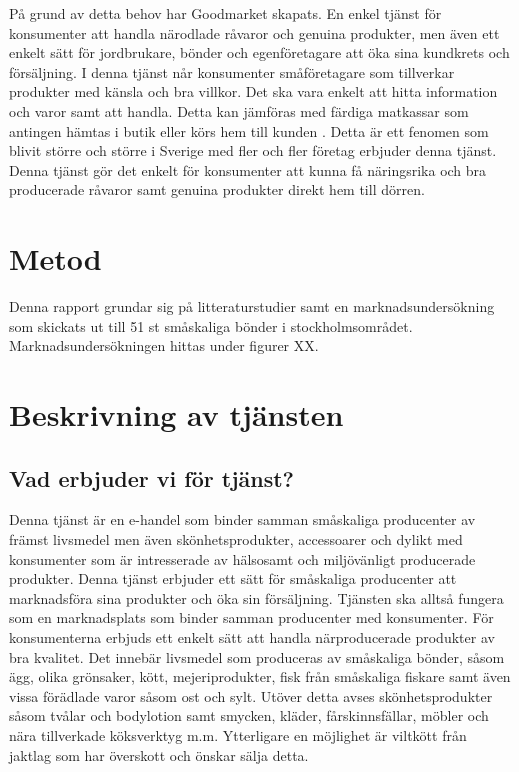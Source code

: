 \documentclass[10pt,a4paper,oneside]{article}
\begin{document}
På grund av detta behov har Goodmarket skapats. En enkel tjänst för konsumenter att handla närodlade råvaror och genuina produkter,  men även ett enkelt sätt för jordbrukare, bönder och egenföretagare att öka sina kundkrets och försäljning. I denna tjänst når konsumenter småföretagare som tillverkar produkter med känsla och bra villkor. Det ska vara enkelt att hitta information och varor samt att handla. Detta kan jämföras med färdiga matkassar som antingen hämtas i butik eller körs hem till kunden \cite{ICA2}. Detta är ett fenomen som blivit större och större i Sverige med fler och fler företag erbjuder denna tjänst. Denna tjänst gör det enkelt för konsumenter att kunna få näringsrika och bra producerade råvaror samt genuina produkter direkt hem till dörren. 

\newpage

\section{Metod}
Denna rapport grundar sig på litteraturstudier samt en marknadsundersökning som skickats ut till 51 st småskaliga bönder i stockholmsområdet. Marknadsundersökningen hittas under figurer XX.
\newpage

\section{Beskrivning av tjänsten}
\subsection{Vad erbjuder vi för tjänst?}
Denna tjänst är en e-handel som binder samman småskaliga producenter av främst livsmedel men även skönhetsprodukter, accessoarer och dylikt med konsumenter som är intresserade av hälsosamt och miljövänligt producerade produkter. Denna tjänst erbjuder ett sätt för småskaliga producenter att marknadsföra sina produkter och öka sin försäljning. Tjänsten ska alltså fungera som en marknadsplats som binder samman producenter med konsumenter. För konsumenterna erbjuds ett enkelt sätt att handla närproducerade produkter av bra kvalitet. Det innebär livsmedel som produceras av småskaliga bönder, såsom ägg, olika grönsaker, kött, mejeriprodukter, fisk från småskaliga fiskare samt även vissa förädlade varor såsom ost och sylt. Utöver detta avses skönhetsprodukter såsom tvålar och bodylotion samt smycken, kläder, fårskinnsfällar, möbler och nära tillverkade köksverktyg m.m. Ytterligare en möjlighet är viltkött från jaktlag som har överskott och önskar sälja detta. 
\end{document}
